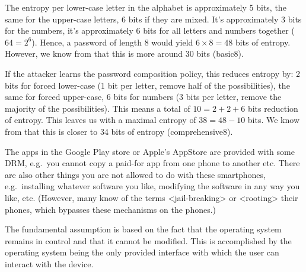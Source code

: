 \documentclass[svv,addpoints]{miunexam}
\begin{document}
\begin{questions}
\begin{solution}
    The entropy per lower-case letter in the alphabet is approximately 5 bits, 
    the same for the upper-case letters, 6 bits if they are mixed.
    It's approximately 3 bits for the numbers, it's approximately 6 bits for 
    all letters and numbers together (\(64 = 2^6\)).
    Hence, a password of length 8 would yield \(6\times 8 = 48\) bits of 
    entropy.
    However, we know from \cite{Komanduri2011opa} that this is more around 30 
    bits (basic8).

    If the attacker learns the password composition policy, this reduces 
    entropy by:
    2 bits for forced lower-case (1 bit per letter, remove half of the 
    possibilities),
    the same for forced upper-case,
    6 bits for numbers (3 bits per letter, remove the majority of the 
    possibilities).
    This means a total of \(10 = 2+2+6\) bits reduction of entropy.
    This leaves us with a maximal entropy of \(38 = 48 - 10\) bits.
    We know from \cite{Komanduri2011opa} that this is closer to 34 bits of 
    entropy (comprehensive8).
  \end{solution}


  \question\label{q:drm:A}
  The apps in the Google Play store or Apple's AppStore are provided with some 
  DRM, e.g.~you cannot copy a paid-for app from one phone to another etc.
  There are also other things you are not allowed to do with these smartphones, 
  e.g.~installing whatever software you like, modifying the software in any way 
  you like, etc.
  (However, many know of the terms <jail-breaking> or <rooting> their phones, 
  which bypasses these mechanisms on the phones.)

  
  \begin{solution}
    The fundamental assumption is based on the fact that the operating system 
    remains in control and that it cannot be modified.
    This is accomplished by the operating system being the only provided 
    interface with which the user can interact with the device.


\end{solution}
\end{questions}
\end{document}

